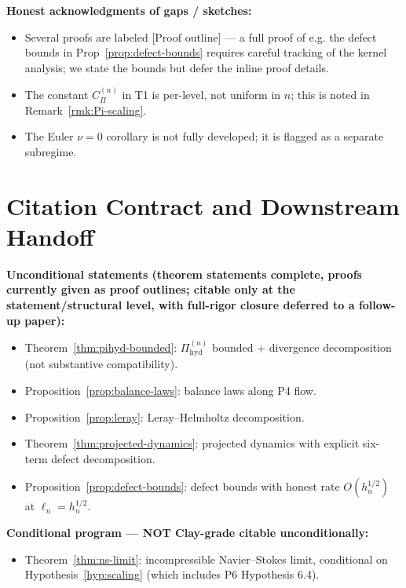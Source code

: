 \documentclass[11pt, a4paper]{amsart}
\theoremstyle{definition}
\newcommand{\Pihyd}{\Pi_{\mathrm{hyd}}}
\begin{document}
\textbf{Honest acknowledgments of gaps / sketches:}
\begin{itemize}
\item Several proofs are labeled [Proof outline] — a full proof of
  e.g. the defect bounds in Prop~\ref{prop:defect-bounds}
  requires careful tracking of the kernel analysis; we state
  the bounds but defer the inline proof details.
\item The constant $C_\Pi^{(n)}$ in T1 is per-level, not
  uniform in $n$; this is noted in Remark~\ref{rmk:Pi-scaling}.
\item The Euler $\nu = 0$ corollary is not fully developed; it
  is flagged as a separate subregime.
\end{itemize}

\section{Citation Contract and Downstream Handoff}
\label{sec:handoff}

\textbf{Unconditional statements (theorem statements complete,
proofs currently given as proof outlines; citable only at the
statement/structural level, with full-rigor closure deferred to
a follow-up paper):}
\begin{itemize}
\item Theorem~\ref{thm:pihyd-bounded}: $\Pihyd^{(n)}$ bounded +
  divergence decomposition (not substantive compatibility).
\item Proposition~\ref{prop:balance-laws}: balance laws along
  P4 flow.
\item Proposition~\ref{prop:leray}: Leray--Helmholtz
  decomposition.
\item Theorem~\ref{thm:projected-dynamics}: projected dynamics
  with explicit six-term defect decomposition.
\item Proposition~\ref{prop:defect-bounds}: defect bounds with
  honest rate $O(h_n^{1/2})$ at $\ell_n = h_n^{1/2}$.
\end{itemize}

\textbf{Conditional program — NOT Clay-grade citable
  unconditionally:}
\begin{itemize}
\item Theorem~\ref{thm:ns-limit}: incompressible Navier--Stokes
  limit, conditional on Hypothesis~\ref{hyp:scaling} (which
  includes P6 Hypothesis 6.4).
\end{itemize}
\end{document}
